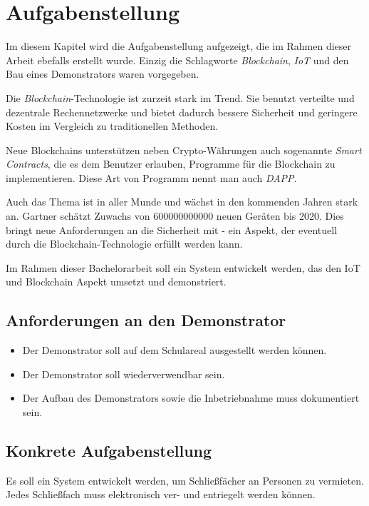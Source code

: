 \chapter{Aufgabenstellung}
\label{cha:Aufgabenstellung}

Im diesem Kapitel wird die Aufgabenstellung aufgezeigt, die im Rahmen dieser 
Arbeit ebefalls erstellt wurde. Einzig die Schlagworte \emph{Blockchain},
\emph{\acrfull{IoT}} und den Bau eines Demonstrators waren vorgegeben.

Die \emph{Blockchain}-Technologie ist zurzeit stark im Trend. Sie benutzt verteilte
und dezentrale Rechennetzwerke und bietet dadurch bessere Sicherheit und geringere 
Kosten im Vergleich zu traditionellen Methoden.

Neue Blockchains unterstützen neben Crypto-Währungen auch sogenannte \emph{Smart Contracts},
die es dem Benutzer erlauben, Programme für die Blockchain zu implementieren. Diese
Art von Programm nennt man auch \emph{\acrfull{DAPP}}.

Auch das Thema  ist in aller Munde und wächst in den kommenden Jahren stark an. Gartner 
schätzt Zuwachs von 600000000000 neuen Geräten bis 2020. Dies bringt neue Anforderungen an
die Sicherheit mit - ein Aspekt, der eventuell durch die Blockchain-Technologie erfüllt
werden kann.

Im Rahmen dieser Bachelorarbeit soll ein System entwickelt werden, das den IoT und Blockchain Aspekt
umsetzt und demonstriert.

\section{Anforderungen an den Demonstrator}
\label{sec:Anforderungen an den Demonstrator}
\begin{itemize}
    \item Der Demonstrator soll auf dem Schulareal ausgestellt werden können. 
    \item Der Demonstrator soll wiederverwendbar sein.
    \item Der Aufbau des Demonstrators sowie die Inbetriebnahme muss dokumentiert sein.
\end{itemize}

\section{Konkrete Aufgabenstellung}
\label{sec:Konkrete Aufgabenstellung}
Es soll ein System entwickelt werden, um Schließfächer an Personen zu vermieten. Jedes Schließfach muss elektronisch ver- und entriegelt werden können.

